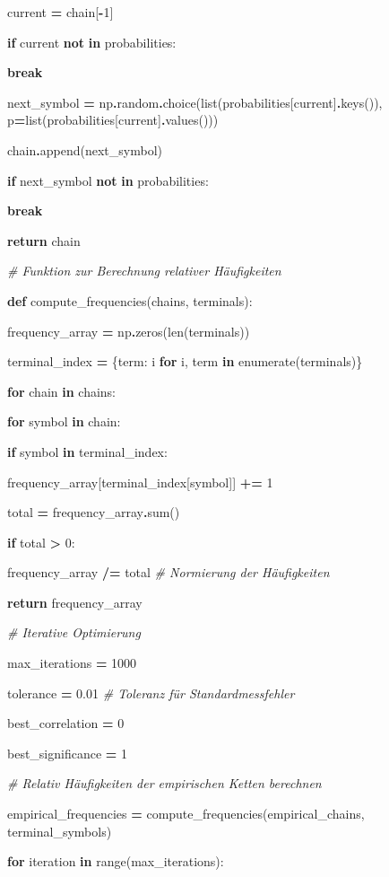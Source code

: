 \documentclass[
]{article}
\begin{document}
current \textbf{=} chain{[}\textbf{-}1{]}

\textbf{if} current \textbf{not} \textbf{in} probabilities:

\textbf{break}

next\_symbol \textbf{=}
np\textbf{.}random\textbf{.}choice(list(probabilities{[}current{]}\textbf{.}keys()),
p\textbf{=}list(probabilities{[}current{]}\textbf{.}values()))

chain\textbf{.}append(next\_symbol)

\textbf{if} next\_symbol \textbf{not} \textbf{in} probabilities:

\textbf{break}

\textbf{return} chain

\emph{\# Funktion zur Berechnung relativer Häufigkeiten}

\textbf{def} compute\_frequencies(chains, terminals):

frequency\_array \textbf{=} np\textbf{.}zeros(len(terminals))

terminal\_index \textbf{=} \{term: i \textbf{for} i, term \textbf{in}
enumerate(terminals)\}

\textbf{for} chain \textbf{in} chains:

\textbf{for} symbol \textbf{in} chain:

\textbf{if} symbol \textbf{in} terminal\_index:

frequency\_array{[}terminal\_index{[}symbol{]}{]} \textbf{+=} 1

total \textbf{=} frequency\_array\textbf{.}sum()

\textbf{if} total \textbf{\textgreater{}} 0:

frequency\_array \textbf{/=} total \emph{\# Normierung der Häufigkeiten}

\textbf{return} frequency\_array

\emph{\# Iterative Optimierung}

max\_iterations \textbf{=} 1000

tolerance \textbf{=} 0.01 \emph{\# Toleranz für Standardmessfehler}

best\_correlation \textbf{=} 0

best\_significance \textbf{=} 1

\emph{\# Relativ Häufigkeiten der empirischen Ketten berechnen}

empirical\_frequencies \textbf{=}
compute\_frequencies(empirical\_chains, terminal\_symbols)

\textbf{for} iteration \textbf{in} range(max\_iterations):
\end{document}
